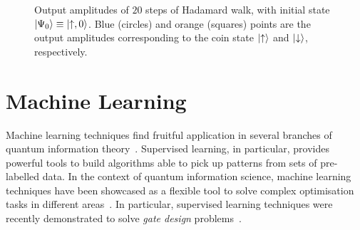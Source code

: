 \begin{figure}[]
    \centering
    \qquad
    \caption{
        Output amplitudes of $20$ steps of Hadamard walk, with initial state $\ket{\Psi_0}\equiv\ket{\uparrow,0}$.
        Blue (circles) and orange (squares) points are the output amplitudes corresponding to the coin state $\ket\uparrow$ and $\ket\downarrow$, respectively.
    }
    \label{fig:hadamardwalk_Nsteps}
\end{figure}

\section{Machine Learning}


Machine learning techniques find fruitful application in several branches of quantum information theory~\cite{mehta2019highbias,spears2018deep,biamonte2017quantum,schuld2014introduction,ciliberto2018quantum,perdomo-ortiz2018opportunities}.
Supervised learning, in particular, provides powerful tools to build algorithms able to pick up patterns from sets of pre-labelled data.
In the context of quantum information science, machine learning techniques have been showcased as a flexible tool to solve complex optimisation tasks in different areas~\cite{zdeborov2017machine,carrasquilla2017machine,carleo2017solving,van2017learning,schoenholz2016structural,torlai2017manybody,rocchetto2019experimental,melnikov2018active,banchi2016quantum,fujita2018construction,innocenti2018supervised}.
In particular, supervised learning techniques were recently demonstrated to solve \emph{gate design} problems~\cite{banchi2016quantum,innocenti2018supervised}.

